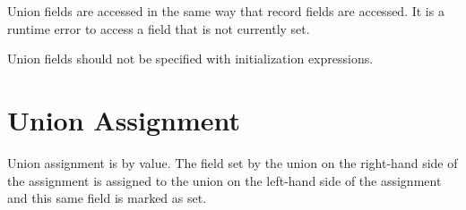 Union fields are accessed in the same way that record fields are
accessed.  It is a runtime error to access a field that is not
currently set.

Union fields should not be specified with initialization expressions.

\section{Union Assignment}
\label{Union_Assignment}

Union assignment is by value.  The field set by the union on the
right-hand side of the assignment is assigned to the union on the
left-hand side of the assignment and this same field is marked as set.

